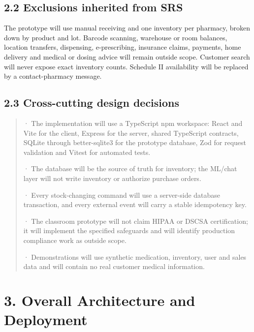 \subsection{2.2 Exclusions inherited from SRS}\label{exclusions-inherited-from-srs}

The prototype will use manual receiving and one inventory per pharmacy, broken down by product and lot. Barcode scanning, warehouse or room balances, location transfers, dispensing, e-prescribing, insurance claims, payments, home delivery and medical or dosing advice will remain outside scope. Customer search will never expose exact inventory counts. Schedule II availability will be replaced by a contact-pharmacy message.

\subsection{2.3 Cross-cutting design decisions}\label{cross-cutting-decisions-requiring-team-approval}

\begin{quote}
· The implementation will use a TypeScript npm workspace: React and Vite for the client, Express for the server, shared TypeScript contracts, SQLite through better-sqlite3 for the prototype database, Zod for request validation and Vitest for automated tests.

· The database will be the source of truth for inventory; the ML/chat layer will not write inventory or authorize purchase orders.

· Every stock-changing command will use a server-side database transaction, and every external event will carry a stable idempotency key.

· The classroom prototype will not claim HIPAA or DSCSA certification; it will implement the specified safeguards and will identify production compliance work as outside scope.

· Demonstrations will use synthetic medication, inventory, user and sales data and will contain no real customer medical information.
\end{quote}





\clearpage
\section{3. Overall Architecture and Deployment}\label{overall-architecture-and-deployment}

